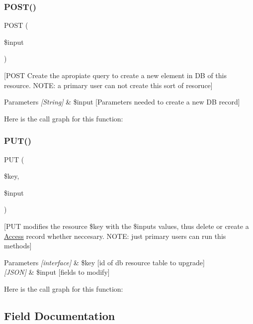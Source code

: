 \subsubsection{\texorpdfstring{P\+O\+S\+T()}{POST()}}
{\footnotesize\ttfamily P\+O\+ST (\begin{DoxyParamCaption}\item[{}]{\$input }\end{DoxyParamCaption})}

\mbox{[}P\+O\+ST Create the apropiate query to create a new element in DB of this resource. N\+O\+TE\+: a primary user can not create this sort of resoruce\mbox{]} 
\begin{DoxyParams}{Parameters}
{\em \mbox{[}\+String\mbox{]}} & \$input \mbox{[}Parameters needed to create a new DB record\mbox{]} \\
\hline
\end{DoxyParams}
Here is the call graph for this function\+:
\mbox{\label{class_accessrequest_ad17c66e0ea82e9537b258d49e61868d8}} 
\subsubsection{\texorpdfstring{P\+U\+T()}{PUT()}}
{\footnotesize\ttfamily P\+UT (\begin{DoxyParamCaption}\item[{}]{\$key,  }\item[{}]{\$input }\end{DoxyParamCaption})}

\mbox{[}P\+UT modifies the resource \$key with the \$inputs values, thus delete or create a \mbox{\hyperlink{class_access}{Access}} record whether neccesary. N\+O\+TE\+: just primary users can run this methods\mbox{]} 
\begin{DoxyParams}{Parameters}
{\em \mbox{[}interface\mbox{]}} & \$key \mbox{[}id of db resource table to upgrade\mbox{]} \\
\hline
{\em \mbox{[}\+J\+S\+O\+N\mbox{]}} & \$input \mbox{[}fields to modify\mbox{]} \\
\hline
\end{DoxyParams}
Here is the call graph for this function\+:


\subsection{Field Documentation}
\mbox{\label{class_accessrequest_aebf9a45aba50bace51a0400cdafdd8d3}} 
